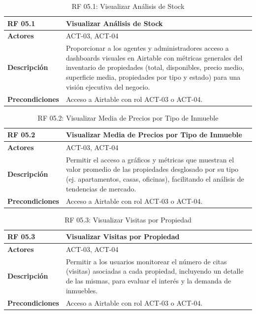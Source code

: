 \begin{table}[H]
\centering
\begin{tabular}{|p{3cm}|p{10cm}|}
\hline
\rowcolor{tealblue}
\textbf{RF 05.1} & \textbf{Visualizar Análisis de Stock} \\
\hline
\textbf{Actores} & ACT-03, ACT-04 \\
\hline
\textbf{Descripción} & Proporcionar a los agentes y administradores acceso a dashboards visuales en Airtable con métricas generales del inventario de propiedades (total, disponibles, precio medio, superficie media, propiedades por tipo y estado) para una visión ejecutiva del negocio. \\
\hline
\textbf{Precondiciones} & Acceso a Airtable con rol ACT-03 o ACT-04. \\
\hline
\end{tabular}
\caption{RF 05.1: Visualizar Análisis de Stock}
\label{tab:rf_airtable_5_1}
\end{table}

\begin{table}[H]
\centering
\begin{tabular}{|p{3cm}|p{10cm}|}
\hline
\rowcolor{tealblue}
\textbf{RF 05.2} & \textbf{Visualizar Media de Precios por Tipo de Inmueble} \\
\hline
\textbf{Actores} & ACT-03, ACT-04 \\
\hline
\textbf{Descripción} & Permitir el acceso a gráficos y métricas que muestran el valor promedio de las propiedades desglosado por su tipo (ej. apartamentos, casas, oficinas), facilitando el análisis de tendencias de mercado. \\
\hline
\textbf{Precondiciones} & Acceso a Airtable con rol ACT-03 o ACT-04. \\
\hline
\end{tabular}
\caption{RF 05.2: Visualizar Media de Precios por Tipo de Inmueble}
\label{tab:rf_airtable_5_2}
\end{table}

\begin{table}[H]
\centering
\begin{tabular}{|p{3cm}|p{10cm}|}
\hline
\rowcolor{tealblue}
\textbf{RF 05.3} & \textbf{Visualizar Visitas por Propiedad} \\
\hline
\textbf{Actores} & ACT-03, ACT-04 \\
\hline
\textbf{Descripción} & Permitir a los usuarios monitorear el número de citas (visitas) asociadas a cada propiedad, incluyendo un detalle de las mismas, para evaluar el interés y la demanda de inmuebles. \\
\hline
\textbf{Precondiciones} & Acceso a Airtable con rol ACT-03 o ACT-04. \\
\hline
\end{tabular}
\caption{RF 05.3: Visualizar Visitas por Propiedad}
\label{tab:rf_airtable_5_3}
\end{table}


